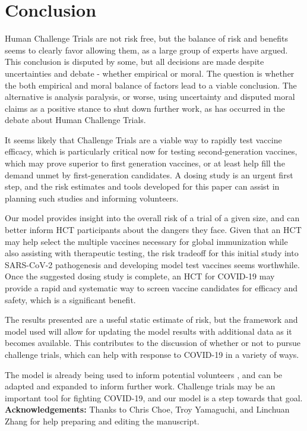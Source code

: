\documentclass{article}
\begin{document}
\section{Conclusion}
Human Challenge Trials are not risk free, but the balance of risk and benefits seems to clearly favor allowing them, as a large group of experts have argued. This conclusion is disputed by some, but all decisions are made despite uncertainties and debate - whether empirical or moral. \cite{lockhart2000moral, macaskill2020moral} The question is whether the both empirical and moral balance of factors lead to a viable conclusion. The alternative is analysis paralysis, or worse, using uncertainty and disputed moral claims as a positive stance to shut down further work, as has occurred in the debate about Human Challenge Trials\cite{martinez2020}.

It seems likely that Challenge Trials are a viable way to rapidly test vaccine efficacy, which is particularly critical now for testing second-generation vaccines, which may prove superior to first generation vaccines, or at least help fill the demand unmet by first-generation candidates. A dosing study is an urgent first step, and the risk estimates and tools developed for this paper can assist in planning such studies and informing volunteers. 

Our model provides insight into the overall risk of a trial of a given size, and can better inform HCT participants about the dangers they face. Given that an HCT may help select the multiple vaccines necessary for global immunization while also assisting with therapeutic testing, the risk tradeoff for this initial study into SARS-CoV-2 pathogenesis and developing model test vaccines seems worthwhile. Once the suggested dosing study is complete, an HCT for COVID-19 may provide a rapid and systematic way to screen vaccine candidates for efficacy and safety, which is a significant benefit.

The results presented are a useful static estimate of risk, but the framework and model used will allow for updating the model results with additional data as it becomes available. This contributes to the discussion of whether or not to pursue challenge trials, which can help with response to COVID-19 in a variety of ways\cite{Nguyen2020}. 

The model is already being used to inform potential volunteers \cite{1DSWeb}, and can be adapted and expanded to inform further work. Challenge trials may be an important tool for fighting COVID-19, and our model is a step towards that goal.\\


{\footnotesize{\textbf{Acknowledgements:} Thanks to Chris Choe, Troy Yamaguchi, and Linchuan Zhang for help preparing and editing the manuscript.}}



\end{document}
